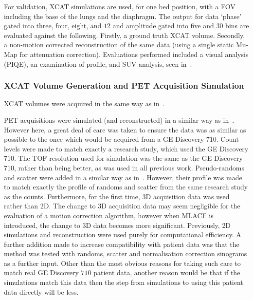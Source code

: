             For validation, \gls{XCAT} simulations are used, for one bed position, with a \gls{FOV} including the base of the lungs and the diaphragm. The output for data `phase' gated into three, four, eight, and $12$ and amplitude gated into five and $30$ bins are evaluated against the following. Firstly, a ground truth \gls{XCAT} volume. Secondly, a non-motion corrected reconstruction of the same data (using a single static \gls{Mu-Map} for attenuation correction). Evaluations performed included a visual analysis (\gls{PIQE}), an examination of profile, and \gls{SUV} analysis, seen in~.
            
            \subsubsection{XCAT Volume Generation and PET Acquisition Simulation} \label{sec:evaluation_of_pet_ct_motion_correction_incorporating_motion_models_using_mlacf_and_complex_gating_schemes_methods_xcat_volume_generation_and_pet_acquisition_simulation}
                \gls{XCAT} volumes were acquired in the same way as in~.

                \gls{PET} acquisitions were simulated (and reconstructed) in a similar way as in~. However here, a great deal of care was taken to ensure the data was as similar as possible to the once which would be acquired from a \gls{GE} Discovery $710$. Count levels were made to match exactly a research study, which used the \gls{GE} Discovery $710$. The \gls{TOF} resolution used for simulation was the same as the \gls{GE} Discovery $710$, rather than being better, as was used in all previous work. Pseudo-randoms and scatter were added in a similar way as in~. However, their profile was made to match exactly the profile of randoms and scatter from the same research study as the counts. Furthermore, for the first time, \gls{3D} acquisition data was used rather than \gls{2D}. The change to \gls{3D} acquisition data may seem negligible for the evaluation of a motion correction algorithm, however when \gls{MLACF} is introduced, the change to \gls{3D} data becomes more significant. Previously, \gls{2D} simulations and reconstruction were used purely for computational efficiency. A further addition made to increase compatibility with patient data was that the method was tested with randoms, scatter and normalisation correction sinograms as a further input. Other than the most obvious reasons for taking such care to match real \gls{GE} Discovery $710$ patient data, another reason would be that if the simulations match this data then the step from simulations to using this patient data directly will be less.
                
